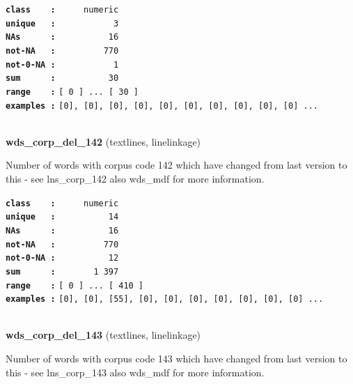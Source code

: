 \documentclass[]{article}
\begin{document}
\textbf{\texttt{class\ \ \ \ :}} \texttt{~~~~~numeric}\\
\textbf{\texttt{unique\ \ \ :}} \texttt{~~~~~~~~~~~3}\\
\textbf{\texttt{NAs\ \ \ \ \ \ :}} \texttt{~~~~~~~~~~16}\\
\textbf{\texttt{not-NA\ \ \ :}} \texttt{~~~~~~~~~770}\\
\textbf{\texttt{not-0-NA\ :}} \texttt{~~~~~~~~~~~1}\\
\textbf{\texttt{sum\ \ \ \ \ \ :}} \texttt{~~~~~~~~~~30}\\
\textbf{\texttt{range\ \ \ \ :}}
\texttt{{[}\ 0\ {]}\ ...\ {[}\ 30\ {]}}\\
\textbf{\texttt{examples\ :}}
\texttt{{[}0{]},\ {[}0{]},\ {[}0{]},\ {[}0{]},\ {[}0{]},\ {[}0{]},\ {[}0{]},\ {[}0{]},\ {[}0{]},\ {[}0{]}\ ...}\\

~

\textbf{wds\_corp\_del\_142} (textlines, linelinkage)

Number of words with corpus code 142 which have changed from last
version to this - see lns\_corp\_142 also wds\_mdf for more information.

\textbf{\texttt{class\ \ \ \ :}} \texttt{~~~~~numeric}\\
\textbf{\texttt{unique\ \ \ :}} \texttt{~~~~~~~~~~14}\\
\textbf{\texttt{NAs\ \ \ \ \ \ :}} \texttt{~~~~~~~~~~16}\\
\textbf{\texttt{not-NA\ \ \ :}} \texttt{~~~~~~~~~770}\\
\textbf{\texttt{not-0-NA\ :}} \texttt{~~~~~~~~~~12}\\
\textbf{\texttt{sum\ \ \ \ \ \ :}} \texttt{~~~~~~~1~397}\\
\textbf{\texttt{range\ \ \ \ :}}
\texttt{{[}\ 0\ {]}\ ...\ {[}\ 410\ {]}}\\
\textbf{\texttt{examples\ :}}
\texttt{{[}0{]},\ {[}0{]},\ {[}55{]},\ {[}0{]},\ {[}0{]},\ {[}0{]},\ {[}0{]},\ {[}0{]},\ {[}0{]},\ {[}0{]}\ ...}\\

~

\textbf{wds\_corp\_del\_143} (textlines, linelinkage)

Number of words with corpus code 143 which have changed from last
version to this - see lns\_corp\_143 also wds\_mdf for more information.
\end{document}
